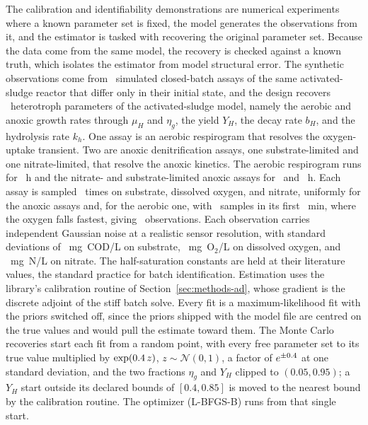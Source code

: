 \documentclass{article}
\begin{document}
The calibration and identifiability demonstrations are numerical experiments where a known parameter set is fixed, the model generates the observations from it, and the estimator is tasked with recovering the original parameter set. Because the data come from the same model, the recovery is checked against a known truth, which isolates the estimator from model structural error. The synthetic observations come from \CalNbatch\ simulated closed-batch assays of the same activated-sludge reactor that differ only in their initial state, and the design recovers \CalNfree\ heterotroph parameters of the activated-sludge model, namely the aerobic and anoxic growth rates through \(\mu_H\) and \(\eta_g\), the yield \(Y_H\), the decay rate \(b_H\), and the hydrolysis rate \(k_h\). One assay is an aerobic respirogram that resolves the oxygen-uptake transient. Two are anoxic denitrification assays, one substrate-limited and one nitrate-limited, that resolve the anoxic kinetics. The aerobic respirogram runs for \CalTAerH~h and the nitrate- and substrate-limited anoxic assays for \CalTNlimH\ and \CalTSlimH~h. Each assay is sampled \CalNsampAssay\ times on substrate, dissolved oxygen, and nitrate, uniformly for the anoxic assays and, for the aerobic one, with \CalAerDenseN\ samples in its first \CalAerDenseMin~min, where the oxygen falls fastest, giving \CalNobs\ observations. Each observation carries independent Gaussian noise at a realistic sensor resolution, with standard deviations of \CalSigSS~mg~COD/L on substrate, \CalSigSO~mg~O\(_2\)/L on dissolved oxygen, and \CalSigSNO~mg~N/L on nitrate. The half-saturation constants are held at their literature values, the standard practice for batch identification. Estimation uses the library's calibration routine of Section~\ref{sec:methods-ad}, whose gradient is the discrete adjoint of the stiff batch solve. Every fit is a maximum-likelihood fit with the priors switched off, since the priors shipped with the model file are centred on the true values and would pull the estimate toward them. The Monte Carlo recoveries start each fit from a random point, with every free parameter set to its true value multiplied by \(\exp(0.4\,z)\), \(z\sim\mathcal{N}(0,1)\), a factor of \(e^{\pm0.4}\) at one standard deviation, and the two fractions \(\eta_g\) and \(Y_H\) clipped to \((0.05,0.95)\); a \(Y_H\) start outside its declared bounds of \([0.4,0.85]\) is moved to the nearest bound by the calibration routine. The optimizer (L-BFGS-B) runs from that single start.
\end{document}

